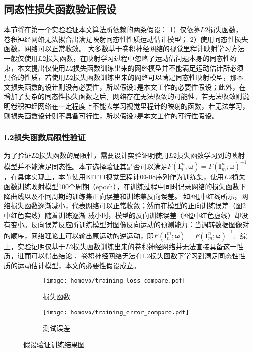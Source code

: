 \subsection{同态性损失函数验证假设}
%
\label{sec:training_loss}
本节将在第一个实验验证本文算法所依赖的两条假设：
1）仅依靠$L2$损失函数，卷积神经网络无法拟合出满足映射同态性性质运动估计模型；
2）使用同态性损失函数，网络可以正常收敛。
大多数基于卷积神经网络的视觉里程计映射学习方法一般仅使用$L2$损失函数，在映射学习过程中忽略了运动估问题本身的同态性约束，本文提出仅使用$L2$损失函数训练出来的网络模型并不能满足运动估计所必须具备的性质，若使用$L2$损失函数训练出来的网络可以满足同态性映射模型，那本文损失函数的设计则没有必要性，所以假设1是本文工作的必要性假设；此外，在增加了复杂的同态性损失函数之后，网络存在无法收敛的可能性，若无法收敛则说明卷积神经网络在一定程度上不能去学习视觉里程计的映射的函数，若无法学习，则损失函数设计则不具备可行性，所以假设2是本文工作的可行性假设。

\subsubsection{L2损失函数局限性验证}
\label{sec:homo_assumation_1}
为了验证$L2$损失函数的局限性，需要设计实验证明使用$L2$损失函数学习到的映射模型并不能满足同态性。本节选择验证其是否可以满足$F(\mathbf{I}_n^m;\mathbf{\omega})=F(\mathbf{I}_m^n;\mathbf{\omega})^{-1}$，在具体实现上，本节使用KITTI视觉里程计00-08序列作为训练集，使用$L2$损失函数训练映射模型100个周期（epoch），在训练过程中同时记录网络的损失函数下降曲线以及不同周期的训练集正向误差和训练集反向误差。
如图\ref{fig:homo_training_loss}中红线所示，网络损失函数逐渐减小，代表网络可以正常收敛；然而在模型的正向训练误差（图\ref{fig:homo_training_error}中红色实线）随着训练逐渐
减小时，模型的反向训练误差（图\ref{fig:homo_training_error}中红色虚线）却没有变小。反向误差反应所训练模型对图像反向运动的预测能力：当调转数据图像对的顺序，网络理论上可以输出原运动的逆运动，即$F(\mathbf{I}_n^m;\mathbf{\omega})= F(\mathbf{I}_m^n;\mathbf{\omega})^{-1}$。综上，实验证明仅基于$L2$损失函数训练出来的卷积神经网络并无法直接具备这一性质，进而可以得出结论：
卷积神经网络无法在L2损失函数下学习到满足同态性性质的运动估计模型，本文的必要性假设成立。
\begin{figure}[h]
    \centering
    \begin{subfigure}[b]{0.48\textwidth}
    \texttt{[image: homovo/training\_loss\_compare.pdf]}
    \caption{损失函数}
    \label{fig:homo_training_loss}
    \end{subfigure}
    \begin{subfigure}[b]{0.48\textwidth}
        \texttt{[image: homovo/training\_error\_compare.pdf]}
        \caption{测试误差}
    \label{fig:homo_training_error}
    \end{subfigure}
    \caption{假设验证训练结果图}
    {\label{fig:homo_assumation}}
    \end{figure}
